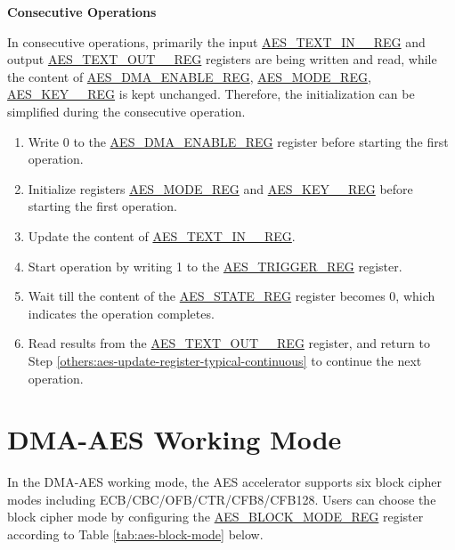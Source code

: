 \documentclass[main\_\_EN.tex]{subfiles}
\begin{document}
\textbf{Consecutive Operations}

In consecutive operations, primarily the input \hyperref[regdesc:AESTEXTINnREG]{AES\_TEXT\_IN\_\_REG} and output \hyperref[regdesc:AESTEXTOUTnREG]{AES\_TEXT\_OUT\_\_REG} registers are being written and read, while the content of \hyperref[regdesc:AESDMAENABLEREG]{AES\_DMA\_ENABLE\_REG}, \hyperref[regdesc:AESMODEREG]{AES\_MODE\_REG}, \hyperref[regdesc:AESKEYnREG]{AES\_KEY\_\_REG}
is kept unchanged. Therefore, the initialization can be simplified during the consecutive operation.

\begin{enumerate}
    \item Write 0 to the \hyperref[regdesc:AESDMAENABLEREG]{AES\_DMA\_ENABLE\_REG} register before starting the first operation.
    \item Initialize registers \hyperref[regdesc:AESMODEREG]{AES\_MODE\_REG} and \hyperref[regdesc:AESKEYnREG]{AES\_KEY\_\_REG}
    before starting the first operation. 
    \item Update the content of \hyperref[regdesc:AESTEXTINnREG]{AES\_TEXT\_IN\_\_REG}. \label{others:aes-update-register-typical-continuous}
    \item Start operation by writing 1 to the \hyperref[regdesc:AESTRIGGERREG]{AES\_TRIGGER\_REG} register.
    \item Wait till the content of the \hyperref[regdesc:AESSTATEREG]{AES\_STATE\_REG} register becomes 0, which indicates the operation completes.
    \item Read results from the \hyperref[regdesc:AESTEXTOUTnREG]{AES\_TEXT\_OUT\_\_REG} register, \label{read result in typical AES continuous calculation} and return to Step \ref{others:aes-update-register-typical-continuous} to continue the next operation.
\end{enumerate}


\section{DMA-AES Working Mode}\label{sec:aes-dma-aes}

In the DMA-AES working mode, the AES accelerator supports six block cipher modes including ECB/CBC/OFB/CTR/CFB8/CFB128. Users can choose the block cipher mode by configuring the \hyperref[regdesc:AESBLOCKMODEREG]{AES\_BLOCK\_MODE\_REG} register according to Table \ref{tab:aes-block-mode} below.
\end{document}
